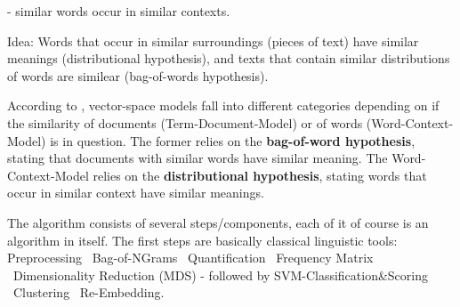 \begin{quote}
     \hfill \textcite{firth57synopsis}
\end{quote}

 - similar words occur in similar contexts.  %

Idea: Words that occur in similar surroundings (pieces of text) have similar meanings (distributional hypothesis), and texts that contain similar distributions of words are similear (bag-of-words hypothesis).


According to \cite{Turney2010}, vector-space models fall into different categories depending on if the similarity of documents (Term-Document-Model) or of words (Word-Context-Model) is in question.  The former relies on the \textbf{bag-of-word hypothesis}, stating that documents with similar words have similar meaning. The Word-Context-Model relies on the \textbf{distributional hypothesis}, stating words that occur in similar context have similar meanings.



\begin{quote}
	 \hfill \textcite{Turney2010}
\end{quote}


The algorithm consists of several steps/components, each of it of course is an algorithm in itself. The first steps are basically classical linguistic tools: Preprocessing \textrightarrow ~Bag-of-NGrams \textrightarrow ~Quantification \textrightarrow ~Frequency Matrix \textrightarrow ~Dimensionality Reduction (MDS) - followed by SVM-Classification\&Scoring \textrightarrow ~Clustering \textrightarrow ~Re-Embedding.

